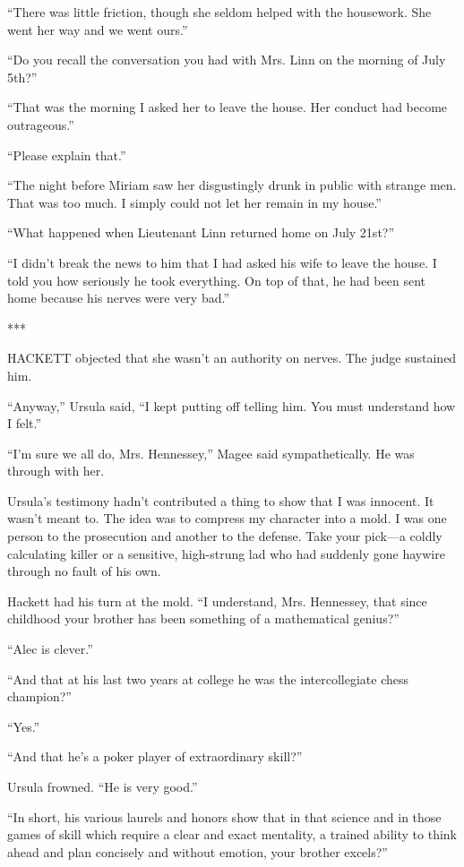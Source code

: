 {“There was little friction, though she seldom helped with the housework. She went her way and we went ours.”

“Do you recall the conversation you had with Mrs. Linn on the morning of July 5th?”

“That was the morning I asked her to leave the house. Her conduct had become outrageous.”

“Please explain that.”

“The night before Miriam saw her disgustingly drunk in public with strange men. That was too much. I simply could not let her remain in my house.”

“What happened when Lieutenant Linn returned home on July 21st?”

“I didn’t break the news to him that I had asked his wife to leave the house. I told you how seriously he took everything. On top of that, he had been sent home because his nerves were very bad.”

***

HACKETT objected that she wasn’t an authority on nerves. The judge sustained him.

“Anyway,” Ursula said, “I kept putting off telling him. You must understand how I felt.”

“I’m sure we all do, Mrs. Hennessey,” Magee said sympathetically. He was through with her.

Ursula’s testimony hadn’t contributed a thing to show that I was innocent. It wasn’t meant to. The idea was to compress my character into a mold. I was one person to the prosecution and another to the defense. Take your pick—a coldly calculating killer or a sensitive, high-strung lad who had suddenly gone haywire through no fault of his own.

Hackett had his turn at the mold. “I understand, Mrs. Hennessey, that since childhood your brother has been something of a mathematical genius?”

“Alec is clever.”

“And that at his last two years at college he was the intercollegiate chess champion?”

“Yes.”

“And that he’s a poker player of extraordinary skill?”

Ursula frowned. “He is very good.”

“In short, his various laurels and honors show that in that science and in those games of skill which require a clear and exact mentality, a trained ability to think ahead and plan concisely and without emotion, your brother excels?”

}
